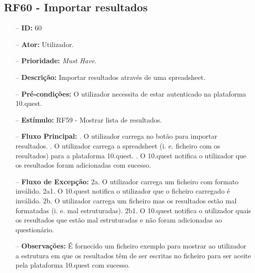 \subsection{RF60 - Importar resultados}
\begin{itemize}
	\item[--] \textbf{ID:} 60
	\item[--]  \textbf{Ator:} Utilizador.
	\item[--]  \textbf{Prioridade:} \textit{Must Have}.
	\item[--]  \textbf{Descrição:} Importar resultados através de uma spreadsheet. 
	\item[--]  \textbf{Pré-condições:} O utilizador necessita de estar autenticado na plataforma 10.quest.
	\item[--]  \textbf{Estímulo:}  
		\subitem RF59 - Mostrar lista de resultados.
	\item[--]  \textbf{Fluxo Principal:} 
	. O utilizador carrega no botão para importar resultados.
	. O utilizador carrega a spreadsheet (i. e. ficheiro com os resultados) para a plataforma 10.quest.
	. O 10.quest notifica o utilizador que os resultados foram adicionadas com sucesso.
	\item[--]  \textbf{Fluxo de Excepção:} 
	\subitem 2a. O utilizador carrega um ficheiro com formato inválido.
	\subitem 2a1. O 10.quest notifica o utilizador que o ficheiro carregado é inválido.
	\subitem 2b. O utilizador carrega um ficheiro mas os resultados estão mal formatadas (i. e. mal estruturadas).
	\subitem 2b1. O 10.quest notifica o utilizador quais os resultados que estão mal estruturadas e não foram adicionadas ao questionário.
	\item[--]  \textbf{Observações:} É fornecido um ficheiro exemplo para mostrar ao utilizador a estrutura em que os resultados têm de ser escritas no ficheiro para ser aceite pela plataforma 10.quest com sucesso.
\end{itemize}
\newpage

